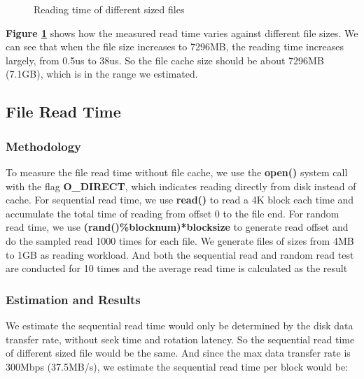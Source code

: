 \begin{figure}[ht]
    \centering
    \caption{Reading time of different sized files}
    \label{file_cache_size}
\end{figure}

\textbf{Figure \ref{file_cache_size}} shows how the measured read time varies against different file sizes. We can see that when the file size increases to 7296MB, the reading time increases largely, from 0.5us to 38us. So the file cache size should be about 7296MB (7.1GB), which is in the range we estimated.

\subsection{File Read Time}
\label {File_read_time_section}
\subsubsection{Methodology}
To measure the file read time without file cache, we use the \textbf{open()} system call with the flag \textbf{O\_DIRECT}, which indicates reading directly from disk instead of cache. For sequential read time, we use \textbf{read()} to read a 4K block each time and accumulate the total time of reading from offset 0 to the file end. For random read time, we use \textbf{(rand()\%blocknum)*blocksize} to generate read offset and do the sampled read 1000 times for each file. We generate files of sizes from 4MB to 1GB as reading workload. And both the sequential read and random read test are conducted for 10 times and the average read time is calculated as the result

\subsubsection{Estimation and Results}
We estimate the sequential read time would only be determined by the disk data transfer rate, without seek time and rotation latency. So the sequential read time of different sized file would be the same. And since the max data transfer rate is 300Mbps (37.5MB/s), we estimate the sequential read time per block would be:

